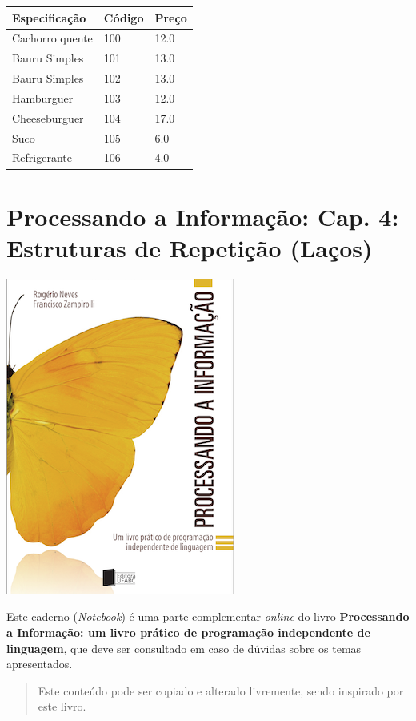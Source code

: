 \documentclass[12pt,a4paper]{article}
\begin{document}
\begin{longtable}[]{@{}lll@{}}
\toprule
Especificação & Código & Preço\tabularnewline
\midrule
\endhead
Cachorro quente & 100 & 12.0\tabularnewline
Bauru Simples & 101 & 13.0\tabularnewline
Bauru Simples & 102 & 13.0\tabularnewline
Hamburguer & 103 & 12.0\tabularnewline
Cheeseburguer & 104 & 17.0\tabularnewline
Suco & 105 & 6.0\tabularnewline
Refrigerante & 106 & 4.0\tabularnewline
\bottomrule
\end{longtable}

    \hypertarget{processando-a-informauxe7uxe3o-cap.-4-estruturas-de-repetiuxe7uxe3o-lauxe7os}{%
\section{Processando a Informação: Cap. 4: Estruturas de Repetição
(Laços)}\label{processando-a-informauxe7uxe3o-cap.-4-estruturas-de-repetiuxe7uxe3o-lauxe7os}}

    \includegraphics{"figs/Capa_Processando_Informacao.jpg"}

Este caderno (\emph{Notebook}) é uma parte complementar \emph{online} do
livro
\textbf{\href{https://editora.ufabc.edu.br/matematica-e-ciencias-da-computacao/58-processando-a-informacao}{Processando
a Informação}: um livro prático de programação independente de
linguagem}, que deve ser consultado em caso de dúvidas sobre os temas
apresentados.

\begin{quote}
Este conteúdo pode ser copiado e alterado livremente, sendo inspirado
por este livro.
\end{quote}
\end{document}
